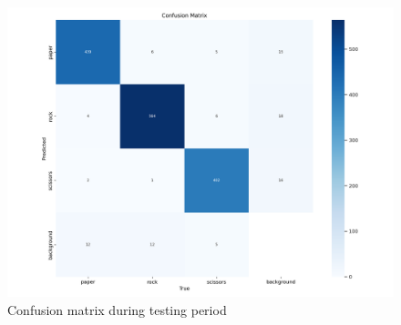 \documentclass[../main]{subfiles}
\begin{document}
\begin{figure}[H]
     \centering
     \includegraphics[width=1\textwidth]{./figures/confusion_matrix}
     \caption{Confusion matrix during testing period}
     \label{fig:red}
\end{figure}
\end{document}
